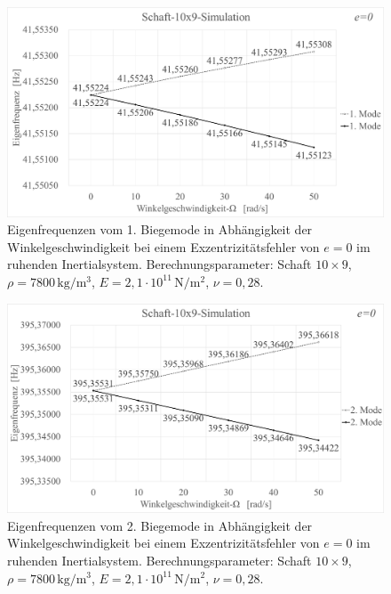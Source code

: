 	\begin{figure}[H]
		\centering
		\includegraphics[width=0.95\linewidth, height=0.36\textheight]{Ergebnisse/Schaft_10x9_1Mode_Simu_ruhend}
		\caption{Eigenfrequenzen vom 1. Biegemode in Abhängigkeit der Winkelgeschwindigkeit bei einem Exzentrizitätsfehler von $ e=0 $ im ruhenden Inertialsystem. Berechnungsparameter: Schaft $ 10\times9 $, $\rho = 7800 \,\text{kg}/\text{m}^{3} $, $ E=2,1\cdot 10^{11} \,\text{N}/\text{m}^{2} $, $ \nu=0,28 $.}
		\label{fig:Result-Schaft-10x9-Simulation-1-Mode-ruhend}
	\end{figure}
	
	\begin{figure}[H]
		\centering
		\includegraphics[width=0.95\linewidth, height=0.36\textheight]{Ergebnisse/Schaft_10x9_2Mode_Simu_ruhend}
		\caption{Eigenfrequenzen vom 2. Biegemode in Abhängigkeit der Winkelgeschwindigkeit bei einem Exzentrizitätsfehler von $ e=0 $ im ruhenden Inertialsystem. Berechnungsparameter: Schaft $ 10\times9 $, $\rho = 7800 \,\text{kg}/\text{m}^{3} $, $ E=2,1\cdot 10^{11} \,\text{N}/\text{m}^{2} $, $ \nu=0,28 $.}
		\label{fig:Result-Schaft-10x9-Simulation-2-Mode-ruhend}
	\end{figure}

